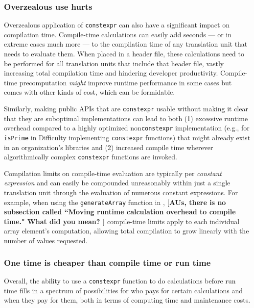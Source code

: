 \subsubsection[Overzealous use hurts]{Overzealous use hurts}\label{overzealous-use-hurts}

Overzealous application of \lstinline!constexpr! can also have a
significant impact on compilation time. Compile-time calculations can
easily add seconds --- or in extreme cases much more --- to the
compilation time of any translation unit that needs to evaluate them.
When placed in a header file, these calculations need to be performed
for all translation units that include that header file, vastly
increasing total compilation time and hindering developer productivity.
Compile-time precomputation \emph{might} improve runtime performance in
some cases but comes with other kinds of cost, which can be formidable.

Similarly, making public APIs that are \lstinline!constexpr! usable without
making it clear that they are suboptimal implementations can lead to
both (1) excessive runtime overhead compared to a highly optimized
non\lstinline!constexpr! implementation (e.g., for \lstinline!isPrime! in
Difficulty implementing \lstinline!constexpr! functions) that
might already exist in an organization's libraries and (2) increased
compile time wherever algorithmically complex \lstinline!constexpr!
functions are invoked. 

Compilation limits on compile-time evaluation are typically per
\emph{constant expression} and can easily be compounded unreasonably
within just a single translation unit through the evaluation of numerous
constant expressions. For example, when using the \lstinline!generateArray!
function in , \textbf{[AUs, there is no subsection called ``Moving
runtime calculation overhead to compile time." What did you mean? ]} compile-time limits
apply to each individual array element's computation, allowing total
compilation to grow linearly with the number of values requested.

\subsubsection[One time is cheaper than compile time or run time]{One time is cheaper than compile time or run time}\label{one-time-is-cheaper-than-compile-time-or-run-time}

Overall, the ability to use a \lstinline!constexpr! function to do
calculations before run time fills in a spectrum of possibilities for
who pays for certain calculations and when they pay for them, both in
terms of computing time and maintenance costs.

